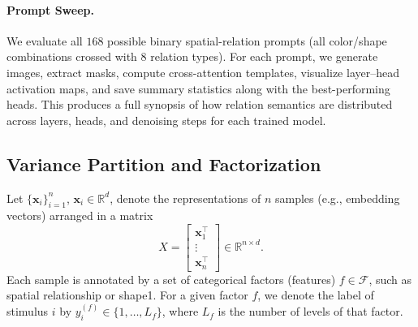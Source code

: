 \paragraph{Prompt Sweep.}
We evaluate all $168$ possible binary spatial-relation prompts (all color/shape combinations crossed with 8 relation types). For each prompt, we generate images, extract masks, compute cross-attention templates, visualize layer–head activation maps, and save summary statistics along with the best-performing heads. This produces a full synopsis of how relation semantics are distributed across layers, heads, and denoising steps for each trained model.

\clearpage
\subsection{Variance Partition and Factorization}\label{method:variance_partitioning}

Let $\{\mathbf{x}_i\}_{i=1}^n$, $\mathbf{x}_i \in \mathbb{R}^d$, denote the representations of $n$ samples (e.g., embedding vectors) arranged in a matrix
\begin{equation}
    X = 
    \begin{bmatrix}
        \mathbf{x}_1^\top \\
        \vdots \\
        \mathbf{x}_n^\top
    \end{bmatrix}
    \in \mathbb{R}^{n \times d}.
\end{equation}
Each sample is annotated by a set of categorical factors (features) $f \in \mathcal{F}$, such as spatial relationship or shape1. For a given factor $f$, we denote the label of stimulus $i$ by $y_i^{(f)} \in \{1,\dots,L_f\}$, where $L_f$ is the number of levels of that factor.


